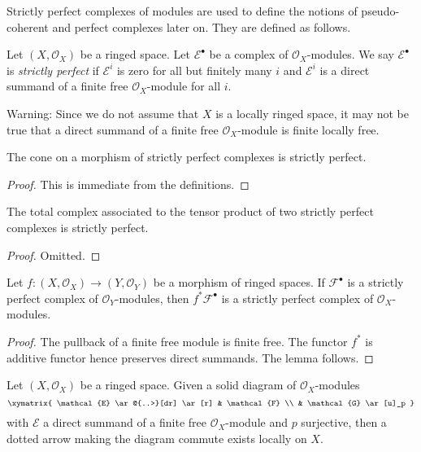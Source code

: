 \noindent
Strictly perfect complexes of modules are used to define the notions
of pseudo-coherent and perfect complexes later on. They are defined
as follows.

\begin{definition}
\label{definition-strictly-perfect}
Let $(X, \mathcal{O}_X)$ be a ringed space.
Let $\mathcal{E}^\bullet$ be a complex of $\mathcal{O}_X$-modules.
We say $\mathcal{E}^\bullet$ is {\it strictly perfect}
if $\mathcal{E}^i$ is zero for all but finitely many $i$ and
$\mathcal{E}^i$ is a direct summand of a finite free
$\mathcal{O}_X$-module for all $i$.
\end{definition}

\noindent
Warning: Since we do not assume that $X$ is a locally ringed space,
it may not be true that a direct summand of a finite free
$\mathcal{O}_X$-module is finite locally free.

\begin{lemma}
\label{lemma-cone}
The cone on a morphism of strictly perfect complexes is
strictly perfect.
\end{lemma}

\begin{proof}
This is immediate from the definitions.
\end{proof}

\begin{lemma}
\label{lemma-tensor}
The total complex associated to the tensor product of two
strictly perfect complexes is strictly perfect.
\end{lemma}

\begin{proof}
Omitted.
\end{proof}

\begin{lemma}
\label{lemma-strictly-perfect-pullback}
Let $f : (X, \mathcal{O}_X) \to (Y, \mathcal{O}_Y)$
be a morphism of ringed spaces. If $\mathcal{F}^\bullet$ is a strictly
perfect complex of $\mathcal{O}_Y$-modules, then
$f^*\mathcal{F}^\bullet$ is a strictly perfect complex of
$\mathcal{O}_X$-modules.
\end{lemma}

\begin{proof}
The pullback of a finite free module is finite free. The functor
$f^*$ is additive functor hence preserves direct summands. The lemma follows.
\end{proof}

\begin{lemma}
\label{lemma-local-lift-map}
Let $(X, \mathcal{O}_X)$ be a ringed space.
Given a solid diagram of $\mathcal{O}_X$-modules
$$
\xymatrix{
\mathcal{E} \ar@{..>}[dr] \ar[r] & \mathcal{F} \\
& \mathcal{G} \ar[u]_p
}
$$
with $\mathcal{E}$ a direct summand of a finite free
$\mathcal{O}_X$-module and $p$ surjective, then a dotted arrow
making the diagram commute exists locally on $X$.
\end{lemma}

